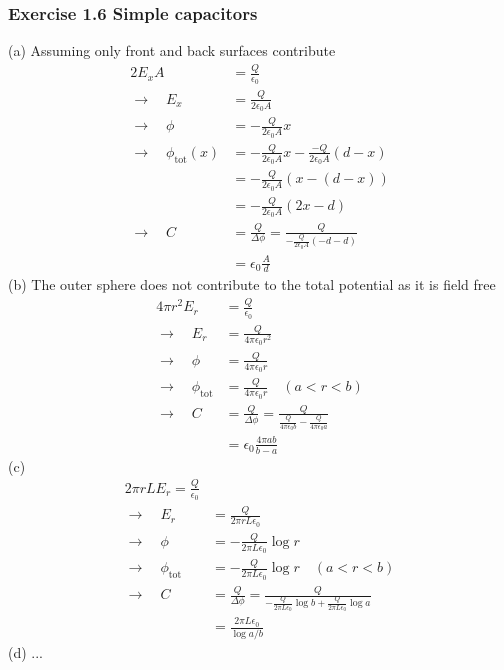 \documentclass[10pt,a4paper]{book}
\theoremstyle{definition}
\begin{document}
\subsubsection{Exercise 1.6 Simple capacitors}
(a) Assuming only front and back surfaces contribute
\begin{align}
2E_xA&=\frac{Q}{\epsilon_0}\\
\rightarrow\quad E_x&=\frac{Q}{2\epsilon_0A}\\
\rightarrow\quad \phi&=-\frac{Q}{2\epsilon_0A}x\\
\rightarrow\quad \phi_\text{tot}(x)&=-\frac{Q}{2\epsilon_0A}x-\frac{-Q}{2\epsilon_0A}(d-x)\\
&=-\frac{Q}{2\epsilon_0A}(x-(d-x))\\
&=-\frac{Q}{2\epsilon_0A}(2x-d)\\
\rightarrow\quad C&=\frac{Q}{\Delta\phi}=\frac{Q}{-\frac{Q}{2\epsilon_0A}(-d-d)}\\
&=\epsilon_0\frac{A}{d}
\end{align}
(b) The outer sphere does not contribute to the total potential as it is field free
\begin{align}
4\pi r^2 E_r&=\frac{Q}{\epsilon_0}\\
\rightarrow\quad E_r&=\frac{Q}{4\pi\epsilon_0 r^2}\\
\rightarrow\quad \phi&=\frac{Q}{4\pi\epsilon_0 r}\\
\rightarrow\quad \phi_\text{tot}&=\frac{Q}{4\pi\epsilon_0 r}\quad(a<r<b)\\
\rightarrow\quad C&=\frac{Q}{\Delta\phi}=\frac{Q}{\frac{Q}{4\pi\epsilon_0 b}-\frac{Q}{4\pi\epsilon_0 a}}\\
&=\epsilon_0\frac{4\pi ab}{b-a}
\end{align}
(c) 
\begin{align}
2\pi r L E_r=\frac{Q}{\epsilon_0}\\
\rightarrow\quad E_r&=\frac{Q}{2\pi r L\epsilon_0}\\
\rightarrow\quad \phi&=-\frac{Q}{2\pi L\epsilon_0}\log r\\
\rightarrow\quad \phi_\text{tot}&=-\frac{Q}{2\pi L\epsilon_0}\log r\quad(a<r<b)\\
\rightarrow\quad C&=\frac{Q}{\Delta\phi}=\frac{Q}{-\frac{Q}{2\pi L\epsilon_0}\log b+\frac{Q}{2\pi L\epsilon_0}\log a}\\
&=\frac{2\pi L\epsilon_0}{\log a/b}
\end{align}
(d) ...
\end{document}
